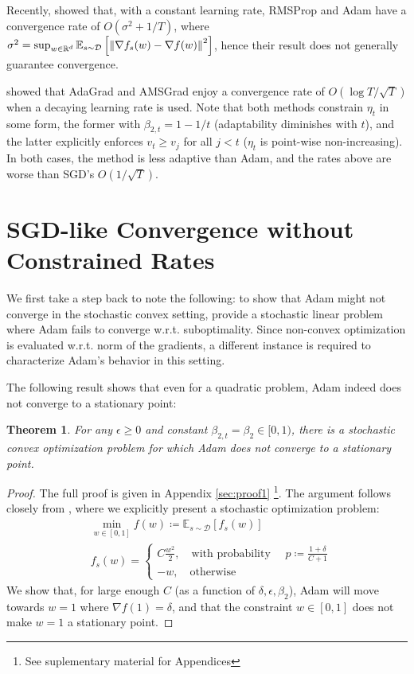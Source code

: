 \documentclass{article}
\newtheorem{thm}{Theorem}
\newcommand{\w}{w}
\newcommand{\fs}{f_s}
\newcommand{\currv}{v_t}
\newcommand{\curre}{\eta_t}
\newcommand{\normed}[1]{\left\lVert {#1} \right\rVert}
\newcommand{\btwo}{\beta_2}
\newcommand{\btwot}{\beta_{2,t}}
\newcommand{\expec}[2]{\mathbb E_{#1} \left[ {#2} \right]}
\newcommand{\dist}{\mathcal D}
\begin{document}
Recently, \citet{yogi} showed that, with a constant learning rate, RMSProp and Adam have a convergence rate of
$O(\sigma^2 + 1/T)$, where
   $\sigma^2 = \sup_{\w \in \R^d}
      \expec{s \sim \dist}{\normed{\nabla \fs(\w) - \nabla f(\w)}^2}$,
hence their result does not generally guarantee convergence. 

\citet{adamlike} showed that
AdaGrad and AMSGrad enjoy a convergence rate of $O(\log T / \sqrt T)$ when a decaying learning rate is used. Note
that both methods constrain $\curre$ in some form, the former with
   $\btwot = 1 - 1/t$ (adaptability diminishes with $t$),
and the latter explicitly enforces
   $\currv \geq v_j$ for all $j < t$ ($\curre$ is point-wise non-increasing).
In both cases, the method is less adaptive than Adam, and the rates above are worse than SGD's $O(1 / \sqrt T)$. \section{SGD-like Convergence without Constrained Rates}
\label{sec:dadam}



We first take a step back to note the following: to show that Adam might not
converge in the stochastic convex setting, \citet{amsgrad} provide a
stochastic linear problem where Adam fails to converge w.r.t. suboptimality.
Since non-convex optimization is evaluated w.r.t. norm of the gradients, a
different instance is required to characterize Adam's behavior in this setting.

The following result shows that even for a quadratic problem, Adam indeed does
not converge to a stationary point:

\begin{thm}
   For any $\epsilon\geq0$ and constant $\btwot = \btwo \in [0,1)$, there is a
   stochastic convex optimization problem for which Adam does not converge to
   a stationary point.
   \label{thm:adamdiv}
\end{thm}
\begin{proof}
   The full proof is given in Appendix \ref{sec:proof1} \footnote{See suplementary material for Appendices}.  The argument follows
   closely from \citet{amsgrad}, where we explicitly present a stochastic
   optimization problem:
   \begin{equation}
   \begin{split}
      & \min_{\w \in [0,1]} f(\w) \coloneqq \expec{s \sim \dist}{\fs(\w)} \\
      & \fs(\w) =
         \begin{cases}
            C \frac{\w^2}2, \quad
               \text{with probability } \quad
               p \coloneqq \frac{1+\delta}{C+1} \\
            -\w, \quad \text{otherwise}
         \end{cases}
   \end{split}
   \end{equation}
   We show that, for large enough $C$ (as a function of
   $\delta, \epsilon, \btwo$), Adam will move towards
   $\w = 1$ where $\nabla f(1) = \delta$, and that the constraint
   $w \in [0,1]$ does not make $w=1$ a stationary point.
\end{proof}
\end{document}
